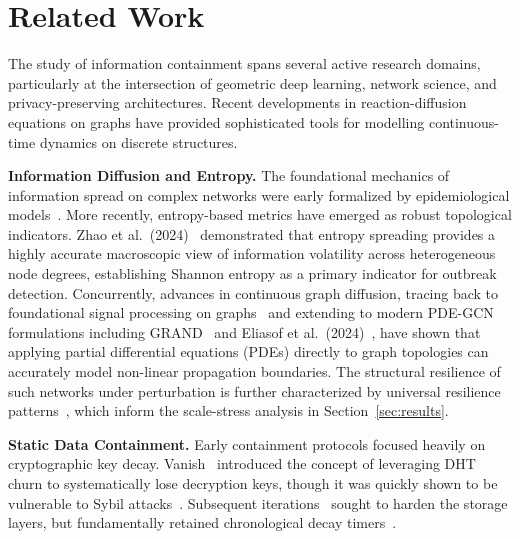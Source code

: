 \documentclass[conference]{IEEEtran}
\begin{document}
\section{Related Work}
\label{sec:related}

The study of information containment spans several active research domains, particularly
at the intersection of geometric deep learning, network science, and privacy-preserving
architectures. Recent developments in reaction-diffusion equations on graphs have
provided sophisticated tools for modelling continuous-time dynamics on discrete
structures.

\textbf{Information Diffusion and Entropy.} The foundational mechanics of information
spread on complex networks were early formalized by epidemiological
models~\cite{pastor2015epidemic}. More recently, entropy-based metrics have emerged as
robust topological indicators. Zhao et al.\ (2024)~\cite{zhao2024multi} demonstrated
that entropy spreading provides a highly accurate macroscopic view of information
volatility across heterogeneous node degrees, establishing Shannon entropy as a primary
indicator for outbreak detection. Concurrently, advances in continuous graph diffusion,
tracing back to foundational signal processing on
graphs~\cite{shuman2013emerging} and extending to modern PDE-GCN formulations including
GRAND~\cite{chamberlain2021grand} and Eliasof et al.\ (2024)~\cite{eliasof2024graph},
have shown that applying partial differential equations (PDEs) directly to graph
topologies can accurately model non-linear propagation boundaries. The structural
resilience of such networks under perturbation is further characterized by universal
resilience patterns~\cite{gao2016universal}, which inform the scale-stress analysis in
Section~\ref{sec:results}.

\textbf{Static Data Containment.} Early containment protocols focused heavily on
cryptographic key decay. Vanish~\cite{geambasu2009vanish} introduced the concept of
leveraging DHT churn to systematically lose decryption keys, though it was quickly
shown to be vulnerable to Sybil attacks~\cite{wolchok2010defeating}. Subsequent
iterations~\cite{tang2010fade, perlman2005ephemerizer} sought to harden the storage
layers, but fundamentally retained chronological decay timers~\cite{douceur2002sybil}.
\end{document}
